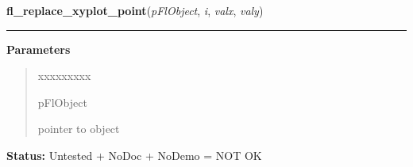     \label{xformslib:flxyplot:fl_replace_xyplot_point}

    \vspace{0.5ex}

\hspace{.8\funcindent}\begin{boxedminipage}{\funcwidth}

    \raggedright \textbf{fl\_replace\_xyplot\_point}(\textit{pFlObject}, \textit{i}, \textit{valx}, \textit{valy})

    \vspace{-1.5ex}

    \rule{\textwidth}{0.5\fboxrule}
\setlength{\parskip}{2ex}
\setlength{\parskip}{1ex}
      \textbf{Parameters}
      \vspace{-1ex}

      \begin{quote}
        \begin{Ventry}{xxxxxxxxx}

          \item[pFlObject]

          pointer to object

        \end{Ventry}

      \end{quote}

\textbf{Status:} Untested + NoDoc + NoDemo = NOT OK



    \end{boxedminipage}

    \label{xformslib:flxyplot:fl_replace_xyplot_point_in_overlay}

    \vspace{0.5ex}

